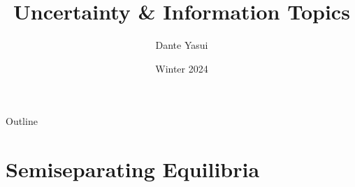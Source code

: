 \documentclass{beamer}
\title{Uncertainty \& Information Topics}
\author{Dante Yasui }
\institute{EC327 Game Theory}
\date{Winter 2024}
\theoremstyle{plain}
\begin{document}
\begin{frame}[plain]
    \titlepage
\end{frame}
\addtocounter{framenumber}{-1}

\begin{frame}[plain]{Outline}
  \tableofcontents
\end{frame}
\addtocounter{framenumber}{-1}


% 
% 
% 
% 
% 
% 
% 

\section{Semiseparating Equilibria}



\end{document}
